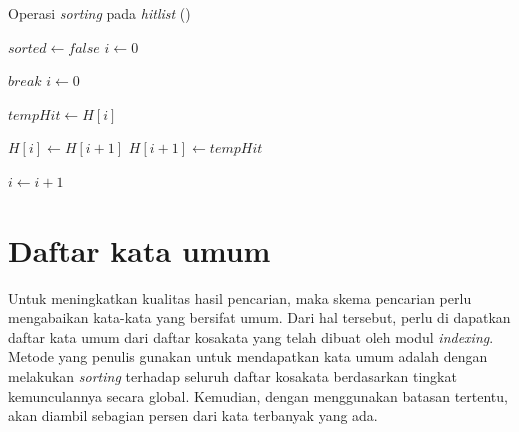 \begin{algorithm}[H]
  \caption{Operasi \textit{sorting} pada \textit{hitlist} (\cite{brin1998google})}\label{alg:insert}
  \begin{algorithmic}
      \State $sorted \gets false$
      \State $i \gets 0$

      \item[] %

        \Do
              \State $break$
            \Else
              \State $i \gets 0$
            \EndIf
          \EndIf

          \item[] %

          \State $tempHit \gets H[i]$

          \item[] %

            \State $H[i] \gets H[i+1]$
            \State $H[i+1] \gets tempHit$
          \EndIf

          \item[] %

          \State $i \gets i+1$

        \item[] %

      \State \Return
    \EndFunction
  \end{algorithmic}
\end{algorithm}

\section{Daftar kata umum}

Untuk meningkatkan kualitas hasil pencarian, maka skema pencarian perlu
mengabaikan kata-kata yang bersifat umum. Dari hal tersebut, perlu di dapatkan
daftar kata umum dari daftar kosakata yang telah dibuat oleh modul
\textit{indexing}. Metode yang penulis gunakan untuk mendapatkan kata umum
adalah dengan melakukan \textit{sorting} terhadap seluruh daftar kosakata
berdasarkan tingkat kemunculannya secara global. Kemudian, dengan menggunakan
batasan tertentu, akan diambil sebagian persen dari kata terbanyak yang ada.

